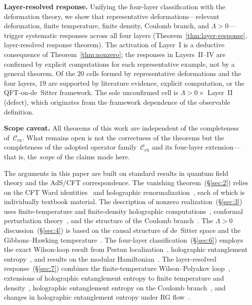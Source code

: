 \documentclass[
  aps,
  prd,
  preprint,
  groupedaddress,
  nofootinbib,
  longbibliography
]{revtex4-2}
\theoremstyle{remark}
\newcommand{\Cex}{\mathcal{C}_{\mathrm{ex}}}
\begin{document}
\textbf{Layer-resolved response.}
Unifying the four-layer classification with the deformation
theory, we show that representative deformations---relevant
deformation, finite temperature, finite density, Coulomb branch,
and $\Lambda>0$---trigger systematic responses across all four
layers (Theorem~\ref{thm:layer-response}, layer-resolved response
theorem).
The activation of Layer~I is a deductive consequence of
Theorem~\ref{thm:nonzero}; the responses in Layers~II--IV
are confirmed by explicit computations for each
representative example, not by a general theorem.
Of the $20$ cells formed by representative deformations and
the four layers, $19$ are supported by literature evidence,
explicit computation, or the QFT-on-de~Sitter framework.
The sole unconfirmed cell is $\Lambda>0 \times$ Layer~II (defect),
which originates from the framework dependence of the observable
definition.

\textbf{Scope caveat.}
All theorems of this work are independent of the completeness
of~$\Cex$.
What remains open is not the correctness of the theorems but
the completeness of the adopted operator family~$\Cex$ and its
four-layer extension---that is, the \emph{scope} of the claims
made here.

\bigskip

The arguments in this paper are built on standard results
in quantum field theory and the AdS/CFT correspondence.
The vanishing theorem~(\S\ref{sec:2}) relies on the CFT Ward
identities~\cite{ref5,ref6,ref13,ref14} and holographic
renormalization~\cite{ref9,ref10,ref11,ref12}, each of which
is individually textbook material.
The description of nonzero realization~(\S\ref{sec:3})
uses finite-temperature and finite-density holographic
computations~\cite{ref4,ref39,ref42}, conformal perturbation
theory~\cite{ref14}, and the structure of the Coulomb
branch~\cite{ref4,ref6,ref7}.
The $\Lambda>0$ discussion~(\S\ref{sec:4}) is based on the
causal structure of de~Sitter space and the Gibbons--Hawking
temperature~\cite{ref15,ref17,ref20,ref21}.
The four-layer classification~(\S\ref{sec:6}) employs the exact
Wilson-loop result from Pestun
localization~\cite{ref31,ref29,ref30}, holographic entanglement
entropy~\cite{ref32,ref33}, and results on the modular
Hamiltonian~\cite{ref34}.
The layer-resolved response~(\S\ref{sec:7}) combines the
finite-temperature Wilson--Polyakov loop~\cite{ref40},
extensions of holographic entanglement entropy to finite
temperature and density~\cite{ref42}, holographic entanglement
entropy on the Coulomb branch~\cite{ref41}, and changes in
holographic entanglement entropy under RG flow~\cite{ref43}.
\end{document}
